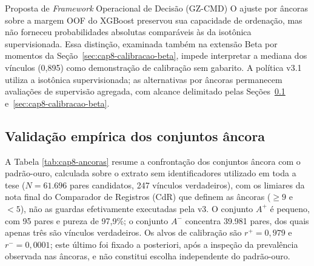 \begin{chapter}{Proposta de \textit{Framework} Operacional de Decisão (GZ-CMD)}
O ajuste por âncoras sobre a margem OOF do XGBoost preservou sua capacidade de ordenação, mas não forneceu probabilidades absolutas comparáveis às da isotônica supervisionada. Essa distinção, examinada também na extensão Beta por momentos da Seção~\ref{sec:cap8-calibracao-beta}, impede interpretar a mediana dos vínculos (0,895) como demonstração de calibração sem gabarito. A política v3.1 utiliza a isotônica supervisionada; as alternativas por âncoras permanecem avaliações de supervisão agregada, com alcance delimitado pelas Seções~\ref{sec:cap8-validacao-ancoras} e~\ref{sec:cap8-calibracao-beta}.

\subsection{Validação empírica dos conjuntos âncora}
\label{sec:cap8-validacao-ancoras}

A Tabela \ref{tab:cap8-ancoras} resume a confrontação dos conjuntos âncora com o padrão-ouro, calculada sobre o extrato sem identificadores utilizado em toda a tese ($N = 61.696$ pares candidatos, 247 vínculos verdadeiros), com os limiares da nota final do Comparador de Registros (CdR) que definem as âncoras ($\geq9$ e $<5$), não as guardas efetivamente executadas pela v3. O conjunto $A^+$ é pequeno, com 95 pares e pureza de 97,9\%; o conjunto $A^-$ concentra 39.981 pares, dos quais apenas três são vínculos verdadeiros. Os alvos de calibração são $r^+ = 0{,}979$ e $r^- = 0{,}0001$; este último foi fixado a posteriori, após a inspeção da prevalência observada nas âncoras, e não constitui escolha independente do padrão-ouro.




\end{chapter}
